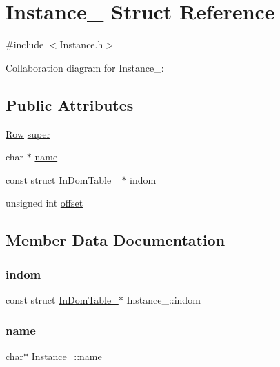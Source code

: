 \hypertarget{structInstance__}{}\section{Instance\+\_\+ Struct Reference}
\label{structInstance__}


{\ttfamily \#include $<$Instance.\+h$>$}



Collaboration diagram for Instance\+\_\+\+:
\subsection*{Public Attributes}
\begin{DoxyCompactItemize}
\item 
\hyperlink{Row_8h_a54193344854aa79a97448ca03062e70c}{Row} \hyperlink{structInstance___a13366eeb6c85eb2bd4011aab8e0c6665}{super}
\item 
char $\ast$ \hyperlink{structInstance___a73a1cd48a1be8ad90b35abded5fafa47}{name}
\item 
const struct \hyperlink{structInDomTable__}{In\+Dom\+Table\+\_\+} $\ast$ \hyperlink{structInstance___a6b49462ee9397b858a5bad1a6a8d4d85}{indom}
\item 
unsigned int \hyperlink{structInstance___aed507087511c6c6a69902d6e698978ec}{offset}
\end{DoxyCompactItemize}


\subsection{Member Data Documentation}
\mbox{\label{structInstance___a6b49462ee9397b858a5bad1a6a8d4d85}} 
\subsubsection{\texorpdfstring{indom}{indom}}
{\footnotesize\ttfamily const struct \hyperlink{structInDomTable__}{In\+Dom\+Table\+\_\+}$\ast$ Instance\+\_\+\+::indom}

\mbox{\label{structInstance___a73a1cd48a1be8ad90b35abded5fafa47}} 
\subsubsection{\texorpdfstring{name}{name}}
{\footnotesize\ttfamily char$\ast$ Instance\+\_\+\+::name}

